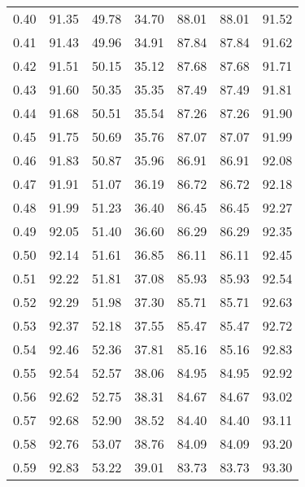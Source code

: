 \begin{tabular}{|c|c|c|c|c|c|c|}
      0.40 &     91.35 &     49.78 &      34.70 &   88.01 &      88.01 &         91.52 \\
      0.41 &     91.43 &     49.96 &      34.91 &   87.84 &      87.84 &         91.62 \\
      0.42 &     91.51 &     50.15 &      35.12 &   87.68 &      87.68 &         91.71 \\
      0.43 &     91.60 &     50.35 &      35.35 &   87.49 &      87.49 &         91.81 \\
      0.44 &     91.68 &     50.51 &      35.54 &   87.26 &      87.26 &         91.90 \\
      0.45 &     91.75 &     50.69 &      35.76 &   87.07 &      87.07 &         91.99 \\
      0.46 &     91.83 &     50.87 &      35.96 &   86.91 &      86.91 &         92.08 \\
      0.47 &     91.91 &     51.07 &      36.19 &   86.72 &      86.72 &         92.18 \\
      0.48 &     91.99 &     51.23 &      36.40 &   86.45 &      86.45 &         92.27 \\
      0.49 &     92.05 &     51.40 &      36.60 &   86.29 &      86.29 &         92.35 \\
      0.50 &     92.14 &     51.61 &      36.85 &   86.11 &      86.11 &         92.45 \\
      0.51 &     92.22 &     51.81 &      37.08 &   85.93 &      85.93 &         92.54 \\
      0.52 &     92.29 &     51.98 &      37.30 &   85.71 &      85.71 &         92.63 \\
      0.53 &     92.37 &     52.18 &      37.55 &   85.47 &      85.47 &         92.72 \\
      0.54 &     92.46 &     52.36 &      37.81 &   85.16 &      85.16 &         92.83 \\
      0.55 &     92.54 &     52.57 &      38.06 &   84.95 &      84.95 &         92.92 \\
      0.56 &     92.62 &     52.75 &      38.31 &   84.67 &      84.67 &         93.02 \\
      0.57 &     92.68 &     52.90 &      38.52 &   84.40 &      84.40 &         93.11 \\
      0.58 &     92.76 &     53.07 &      38.76 &   84.09 &      84.09 &         93.20 \\
      0.59 &     92.83 &     53.22 &      39.01 &   83.73 &      83.73 &         93.30 \\

\end{tabular}
